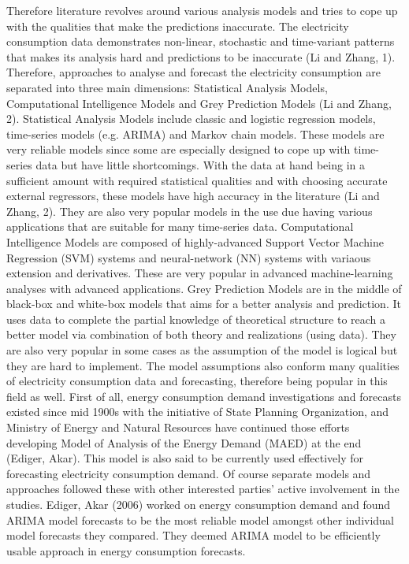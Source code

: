 \documentclass[11pt, a4paper, leqno]{article}
\begin{document}
Therefore literature revolves around various analysis models and tries to cope up with the qualities that make the predictions inaccurate. The electricity consumption data demonstrates non-linear, stochastic and time-variant patterns that makes its analysis hard and predictions to be inaccurate (Li and Zhang, 1). Therefore, approaches to analyse and forecast the electricity consumption are separated into three main dimensions: Statistical Analysis Models, Computational Intelligence Models and Grey Prediction Models (Li and Zhang, 2).
Statistical Analysis Models include classic and logistic regression models, time-series models (e.g. ARIMA) and Markov chain models. These models are very reliable models since some are especially designed to cope up with time-series data but have little shortcomings. With the data at hand being in a sufficient amount with required statistical qualities and with choosing accurate external regressors, these models have high accuracy in the literature (Li and Zhang, 2). They are also very popular models in the use due having various applications that are suitable for many time-series data.
Computational Intelligence Models are composed of highly-advanced Support Vector Machine Regression (SVM) systems and neural-network (NN) systems with variaous extension and derivatives. These are very popular in advanced machine-learning analyses with advanced applications.
Grey Prediction Models are in the middle of black-box and white-box models that aims for a better analysis and prediction. It uses data to complete the partial knowledge of theoretical structure to reach a better model via combination of both theory and realizations (using data). They are also very popular in some cases as the assumption of the model is logical but they are hard to implement. The model assumptions also conform many qualities of electricity consumption data and forecasting, therefore being popular in this field as well.
First of all, energy consumption demand investigations and forecasts existed since mid 1900s with the initiative of State Planning Organization, and Ministry of Energy and Natural Resources have continued those efforts developing Model of Analysis of the Energy Demand (MAED) at the end (Ediger, Akar). This model is also said to be currently used effectively for forecasting electricity consumption demand. Of course separate models and approaches followed these with other interested parties’ active involvement in the studies.
Ediger, Akar (2006) worked on energy consumption demand and found ARIMA model forecasts to be the most reliable model amongst other individual model forecasts they compared. They deemed ARIMA model to be efficiently usable approach in energy consumption forecasts.
\end{document}
